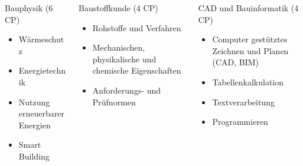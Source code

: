 \documentclass[slidestop,compress,mathserif, aspectratio = 169, 9pt]{beamer}
\begin{document}
{ \begin{columns}[t] 
     \begin{column}[T]{4.5cm} 
     Bauphysik (6 CP)
     	\begin{itemize}
	\item Wärmeschutz
	\item Energietechnik 
	\item Nutzung erneuerbarer Energien 
	\item Smart Building 
     	\end{itemize}
     \end{column}
     	\begin{column}[T]{4.5cm} 
	Baustoffkunde (4 CP)
     	\begin{itemize}
     	\item Rohstoffe und Verfahren
	\item Mechanischen, physikalische und chemische Eigenschaften 
	\item Anforderungs- und Prüfnormen
	 \end{itemize}
     \end{column}
     \begin{column}[T]{4.5cm} 
     CAD und Bauinformatik (4 CP)
     	\begin{itemize}
	\item Computer gestütztes Zeichnen und Planen (CAD, BIM)
	\item Tabellenkalkulation
	\item Textverarbeitung
	\item Programmieren
     	\end{itemize}
     \end{column}
 \end{columns}

}
\end{document}
